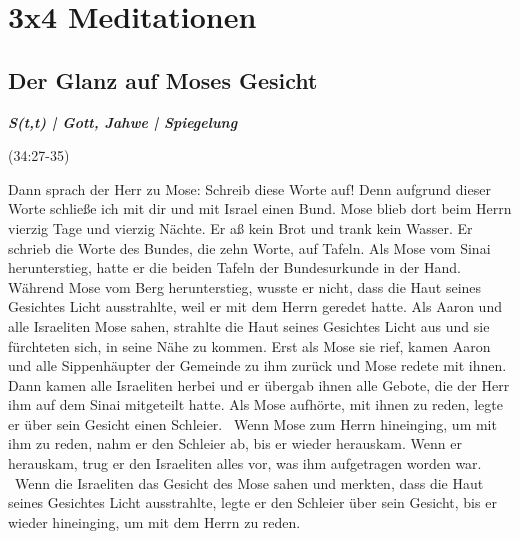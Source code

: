 

\chapter{3x4 Meditationen}
\newpage
\section{Der Glanz auf Moses Gesicht}

\textbf{\textit{S(t,t) | Gott, Jahwe | Spiegelung}}

(34:27-35)
\begin{BibelSt}
Dann sprach der Herr zu Mose: Schreib diese Worte auf! Denn aufgrund dieser Worte schließe ich mit dir und mit Israel einen Bund. Mose blieb dort beim Herrn vierzig Tage und vierzig Nächte. Er aß kein Brot und trank kein Wasser. Er schrieb die Worte des Bundes, die zehn Worte, auf Tafeln. Als Mose vom Sinai herunterstieg, hatte er die beiden Tafeln der Bundesurkunde in der Hand. Während Mose vom Berg herunterstieg, wusste er nicht, dass die Haut seines Gesichtes Licht ausstrahlte, weil er mit dem Herrn geredet hatte. Als Aaron und alle Israeliten Mose sahen, strahlte die Haut seines Gesichtes Licht aus und sie fürchteten sich, in seine Nähe zu kommen. Erst als Mose sie rief, kamen Aaron und alle Sippenhäupter der Gemeinde zu ihm zurück und Mose redete mit ihnen. Dann kamen alle Israeliten herbei und er übergab ihnen alle Gebote, die der Herr ihm auf dem Sinai mitgeteilt hatte.  Als Mose aufhörte, mit ihnen zu reden, legte er über sein Gesicht einen Schleier.  Wenn Mose zum Herrn hineinging, um mit ihm zu reden, nahm er den Schleier ab, bis er wieder herauskam. Wenn er herauskam, trug er den Israeliten alles vor, was ihm aufgetragen worden war.  Wenn die Israeliten das Gesicht des Mose sahen und merkten, dass die Haut seines Gesichtes Licht ausstrahlte, legte er den Schleier über sein Gesicht, bis er wieder hineinging, um mit dem Herrn zu reden.
\end{BibelSt}
